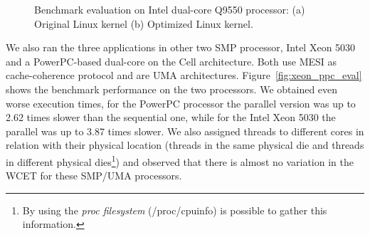 \documentclass[conference]{IEEEtran}
\begin{document}
\begin{figure}[htb]
\centering
{}
\caption{Benchmark evaluation on Intel dual-core Q9550 processor: (a) Original Linux kernel (b) Optimized Linux kernel.}
\label{fig:q9550_eval}
\end{figure}

We also ran the three applications in other two SMP processor, Intel Xeon 5030 and a PowerPC-based dual-core on the Cell architecture. Both use MESI as cache-coherence protocol and are UMA architectures. Figure~\ref{fig:xeon_ppc_eval} shows the benchmark performance on the two processors. We obtained even worse execution times, for the PowerPC processor the parallel version was up to 2.62 times slower than the sequential one, while for the Intel Xeon 5030 the parallel was up to 3.87 times slower. We also assigned threads to different cores in relation with their physical location (threads in the same physical die and threads in different physical dies\footnote{By using the \emph{proc filesystem} (/proc/cpuinfo) is possible to gather this information.}) and observed that there is almost no variation in the WCET for these SMP/UMA processors.
\end{document}
